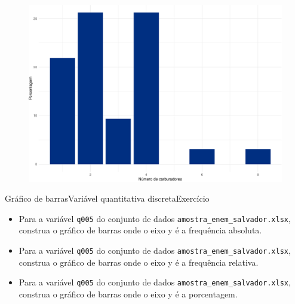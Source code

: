 \documentclass[
  10pt,
  ignorenonframetext,
]{beamer}
\providecommand{\tightlist}{%
  \setlength{\itemsep}{0pt}\setlength{\parskip}{0pt}}\usepackage{longtable,booktabs,array}
\begin{document}
\begin{frame}
\begin{figure}

{\centering \includegraphics[width=1\textwidth,height=\textheight]{exploracao-visualizacao_files/figure-beamer/unnamed-chunk-69-1.pdf}

}

\end{figure}
\end{frame}

\begin{frame}[fragile]{Gráfico de barras\newline Variável quantitativa
discreta\newline Exercício}
\protect\hypertarget{gruxe1fico-de-barrasvariuxe1vel-quantitativa-discretaexercuxedcio}{}
\begin{itemize}
\tightlist
\item
  Para a variável \texttt{q005} do conjunto de dados
  \texttt{amostra\_enem\_salvador.xlsx}, construa o gráfico de barras
  onde o eixo y é a frequência absoluta.
\item
  Para a variável \texttt{q005} do conjunto de dados
  \texttt{amostra\_enem\_salvador.xlsx}, construa o gráfico de barras
  onde o eixo y é a frequência relativa.
\item
  Para a variável \texttt{q005} do conjunto de dados
  \texttt{amostra\_enem\_salvador.xlsx}, construa o gráfico de barras
  onde o eixo y é a porcentagem.
\end{itemize}
\end{frame}
\end{document}
